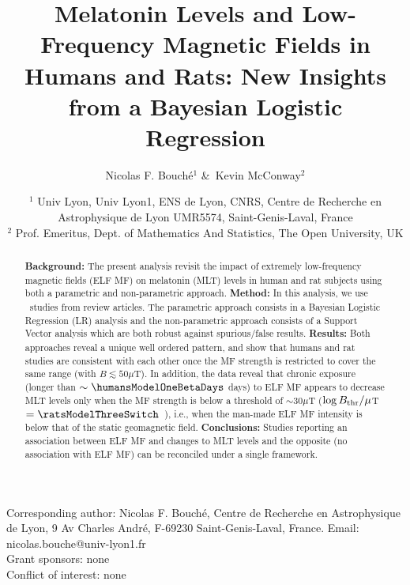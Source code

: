 \documentclass[letter,twoside]{article}
\begin{document}

\title{ Melatonin Levels and Low-Frequency Magnetic Fields in Humans and Rats: New Insights from a Bayesian Logistic Regression}



\author{Nicolas F. Bouché$^1$ \&\ Kevin McConway$^2$} 
\date{%
$^1$ Univ Lyon, Univ Lyon1, ENS de Lyon, CNRS, Centre de Recherche en Astrophysique de Lyon UMR5574,   Saint-Genis-Laval, France\\
$^2$ Prof. Emeritus, Dept. of Mathematics And Statistics, The Open University, UK
}
 \maketitle
 
 Corresponding author: Nicolas F. Bouché, Centre de Recherche en Astrophysique de Lyon, 9 Av Charles André, F-69230 Saint-Genis-Laval, France. Email: nicolas.bouche@univ-lyon1.fr\\
Grant sponsors: none\\
Conflict of interest: none 
\clearpage

\begin{abstract}
{\bf Background:}
 The present analysis revisit the impact  of extremely low-frequency magnetic fields (ELF MF) on  melatonin (MLT) levels in human and rat subjects using both a parametric and non-parametric approach. 
 {\bf Method:}
 In this analysis, we use    \Ntot\    studies from review articles.
 The parametric approach consists in a Bayesian Logistic Regression (LR) analysis   and the non-parametric approach consists of a Support Vector analysis which  are both robust against spurious/false results.
{\bf Results:}  Both approaches reveal a unique well ordered pattern, and show that humans and rat studies are consistent with each other
once the MF strength is restricted to cover the same range (with $B\lesssim50\mu$T). In addition, the data reveal that chronic exposure  (longer than $\sim\humansModelOneBetaDays$ days)  to ELF MF appears to decrease MLT levels only when the MF strength is below a threshold of $\sim30\mu$T ($\log B_{\rm thr}/\mu$T$=\ratsModelThreeSwitch$~\ratsModelThreeSwitchErr), i.e.,   when the man-made ELF MF intensity is below that of the static  geomagnetic field. 
{\bf Conclusions:}
Studies reporting an association between ELF MF and changes to MLT levels and  the opposite (no association with ELF MF) can be reconciled under a single framework.
\end{abstract}
\end{document}
